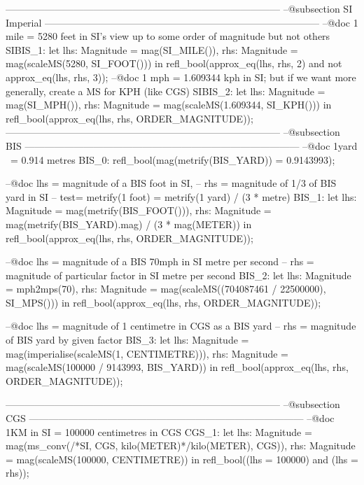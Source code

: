 \documentclass[a4paper]{article}
\begin{document}
\begin{vdm_al}
------------------------------------------------------------------------------------
--@subsection SI Imperial 
------------------------------------------------------------------------------------
 --@doc 1 mile = 5280 feet in SI's view up to some order of magnitude but not others
 SIBIS_1: let
       lhs: Magnitude = mag(SI_MILE()),
       rhs: Magnitude = mag(scaleMS(5280, SI_FOOT()))
      in
       refl_bool(approx_eq(lhs, rhs, 2) and not approx_eq(lhs, rhs, 3));
 --@doc 1 mph = 1.609344 kph in SI; but if we want more generally, create a MS for KPH (like CGS)
 SIBIS_2: let
        lhs: Magnitude = mag(SI_MPH()),
       rhs: Magnitude = mag(scaleMS(1.609344, SI_KPH()))
      in
       refl_bool(approx_eq(lhs, rhs, ORDER_MAGNITUDE));         
------------------------------------------------------------------------------------
--@subsection BIS 
------------------------------------------------------------------------------------
 --@doc 1yard ~= 0.914 metres
 BIS_0: refl_bool(mag(metrify(BIS_YARD)) = 0.9143993);

 --@doc lhs = magnitude of a BIS foot in SI,
 --   rhs = magnitude of 1/3 of BIS yard in SI
 --   test= metrify(1 foot) = metrify(1 yard) / (3 * metre)
 BIS_1: let
     lhs: Magnitude = mag(metrify(BIS_FOOT())),
     rhs: Magnitude = mag(metrify(BIS_YARD).mag) / (3 * mag(METER))
    in   
     refl_bool(approx_eq(lhs, rhs, ORDER_MAGNITUDE));

 --@doc lhs = magnitude of a BIS 70mph in SI metre per second
 --   rhs = magnitude of particular factor in SI metre per second
 BIS_2: let
     lhs: Magnitude = mph2mps(70),
     rhs: Magnitude = mag(scaleMS((704087461 / 22500000), SI_MPS()))
    in   
     refl_bool(approx_eq(lhs, rhs, ORDER_MAGNITUDE));

 --@doc lhs = magnitude of 1 centimetre in CGS as a BIS yard
 --   rhs = magnitude of BIS yard by given factor 
 BIS_3: let
     lhs: Magnitude = mag(imperialise(scaleMS(1, CENTIMETRE))), 
     rhs: Magnitude = mag(scaleMS(100000 / 9143993, BIS_YARD))
    in   
     refl_bool(approx_eq(lhs, rhs, ORDER_MAGNITUDE));
                        
------------------------------------------------------------------------------------
--@subsection CGS
------------------------------------------------------------------------------------
 --@doc 1KM in SI = 100000 centimetres in CGS
 CGS_1: let 
      lhs: Magnitude = mag(ms_conv(/*SI, CGS, kilo(METER)*/kilo(METER), CGS)),
      rhs: Magnitude = mag(scaleMS(100000, CENTIMETRE))
     in
      refl_bool((lhs = 100000) and (lhs = rhs));


\end{vdm_al}
\end{document}
